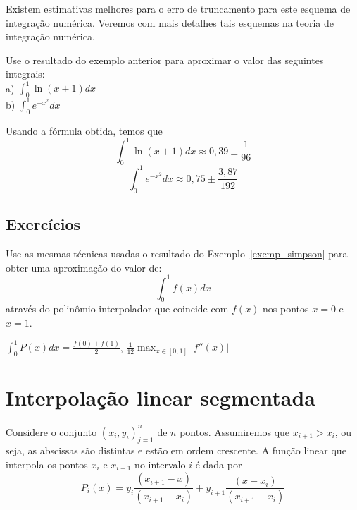 \begin{obs}Existem estimativas melhores para o erro de truncamento para este esquema de integração numérica. Veremos com mais detalhes tais esquemas na teoria de integração numérica.
\end{obs}

\begin{ex}
Use o resultado do exemplo anterior para aproximar o valor das seguintes integrais:\\

a) $\displaystyle \int_0^1 \ln(x+1) dx$\\

b) $\displaystyle \int_0^1 e^{-x^2}dx$

\end{ex}
\begin{sol}
Usando a fórmula obtida, temos que
\begin{equation}
\int_0^1\ln(x+1) dx \approx 0,39\pm \frac{1}{96}
\end{equation}
\begin{equation}
\int_0^1 e^{-x^2} dx \approx 0,75\pm \frac{3,87}{192}
\end{equation}
\end{sol}

\subsection*{Exercícios}

\begin{exer}
  Use as mesmas técnicas usadas o resultado do Exemplo~\ref{exemp_simpson} para obter uma aproximação do valor de:
  \begin{equation}
    \int_0^1 f(x)dx
  \end{equation}
através do polinômio interpolador que coincide com $f(x)$ nos pontos $x=0$ e $x=1$.
\end{exer}
\begin{resp}

  $\int_0^1 P(x)dx =\frac{f(0)+f(1)}{2}$, $\frac{1}{12}\max_{x\in[0,1]}|f''(x)|$

\end{resp}

\section{Interpolação linear segmentada}
Considere o conjunto $\left(x_i,y_i\right)_{j=1}^n$ de $n$ pontos. Assumiremos que $x_{i+1}>x_i$, ou seja, as abscissas são distintas e estão em ordem crescente. A função linear que interpola os pontos $x_i$ e $x_{i+1}$ no intervalo $i$ é dada por
\begin{equation} P_i(x)=y_i \frac{(x_{i+1}-x)}{(x_{i+1}-x_i)} + y_{i+1} \frac{(x-x_i)}{(x_{i+1}-x_i)} \end{equation}

